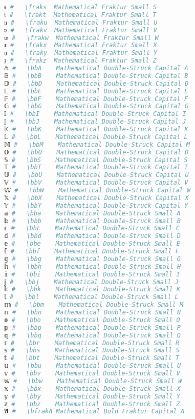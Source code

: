 \begin{lstlisting}[language=Julia]
𝔰 #   \fraks  Mathematical Fraktur Small S
𝔱 #   \frakt  Mathematical Fraktur Small T
𝔲 #   \fraku  Mathematical Fraktur Small U
𝔳 #   \frakv  Mathematical Fraktur Small V
𝔴 #   \frakw  Mathematical Fraktur Small W
𝔵 #   \frakx  Mathematical Fraktur Small X
𝔶 #   \fraky  Mathematical Fraktur Small Y
𝔷 #   \frakz  Mathematical Fraktur Small Z
𝔸 #   \bbA    Mathematical Double-Struck Capital A
𝔹 #   \bbB    Mathematical Double-Struck Capital B
𝔻 #   \bbD    Mathematical Double-Struck Capital D
𝔼 #   \bbE    Mathematical Double-Struck Capital E
𝔽 #   \bbF    Mathematical Double-Struck Capital F
𝔾 #   \bbG    Mathematical Double-Struck Capital G
𝕀 #   \bbI    Mathematical Double-Struck Capital I
𝕁 #   \bbJ    Mathematical Double-Struck Capital J
𝕂 #   \bbK    Mathematical Double-Struck Capital K
𝕃 #   \bbL    Mathematical Double-Struck Capital L
𝕄 #   \bbM    Mathematical Double-Struck Capital M
𝕆 #   \bbO    Mathematical Double-Struck Capital O
𝕊 #   \bbS    Mathematical Double-Struck Capital S
𝕋 #   \bbT    Mathematical Double-Struck Capital T
𝕌 #   \bbU    Mathematical Double-Struck Capital U
𝕍 #   \bbV    Mathematical Double-Struck Capital V
𝕎 #   \bbW    Mathematical Double-Struck Capital W
𝕏 #   \bbX    Mathematical Double-Struck Capital X
𝕐 #   \bbY    Mathematical Double-Struck Capital Y
𝕒 #   \bba    Mathematical Double-Struck Small A
𝕓 #   \bbb    Mathematical Double-Struck Small B
𝕔 #   \bbc    Mathematical Double-Struck Small C
𝕕 #   \bbd    Mathematical Double-Struck Small D
𝕖 #   \bbe    Mathematical Double-Struck Small E
𝕗 #   \bbf    Mathematical Double-Struck Small F
𝕘 #   \bbg    Mathematical Double-Struck Small G
𝕙 #   \bbh    Mathematical Double-Struck Small H
𝕚 #   \bbi    Mathematical Double-Struck Small I
𝕛 #   \bbj    Mathematical Double-Struck Small J
𝕜 #   \bbk    Mathematical Double-Struck Small K
𝕝 #   \bbl    Mathematical Double-Struck Small L
𝕞 #   \bbm    Mathematical Double-Struck Small M
𝕟 #   \bbn    Mathematical Double-Struck Small N
𝕠 #   \bbo    Mathematical Double-Struck Small O
𝕡 #   \bbp    Mathematical Double-Struck Small P
𝕢 #   \bbq    Mathematical Double-Struck Small Q
𝕣 #   \bbr    Mathematical Double-Struck Small R
𝕤 #   \bbs    Mathematical Double-Struck Small S
𝕥 #   \bbt    Mathematical Double-Struck Small T
𝕦 #   \bbu    Mathematical Double-Struck Small U
𝕧 #   \bbv    Mathematical Double-Struck Small V
𝕨 #   \bbw    Mathematical Double-Struck Small W
𝕩 #   \bbx    Mathematical Double-Struck Small X
𝕪 #   \bby    Mathematical Double-Struck Small Y
𝕫 #   \bbz    Mathematical Double-Struck Small Z
𝕬 #   \bfrakA Mathematical Bold Fraktur Capital A

\end{lstlisting}
